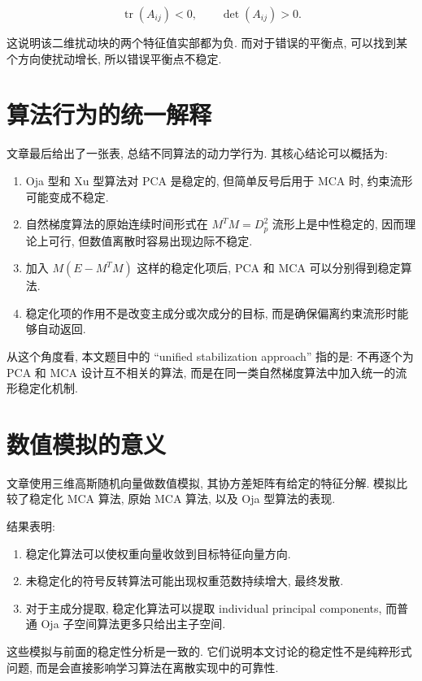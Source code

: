 \documentclass[oneside]{ctexart}
\DeclareMathOperator{\tr}{tr}
\begin{document}
\begin{equation}
    \tr(A_{ij})<0,
    \qquad
    \det(A_{ij})>0.
\end{equation}

这说明该二维扰动块的两个特征值实部都为负. 而对于错误的平衡点, 可以找到某个方向使扰动增长, 所以错误平衡点不稳定.

\section{算法行为的统一解释}

文章最后给出了一张表, 总结不同算法的动力学行为. 其核心结论可以概括为:

\begin{enumerate}[(1)]
    \item Oja 型和 Xu 型算法对 PCA 是稳定的, 但简单反号后用于 MCA 时, 约束流形可能变成不稳定.
    \item 自然梯度算法的原始连续时间形式在 $M^TM=D_p^2$ 流形上是中性稳定的, 因而理论上可行, 但数值离散时容易出现边际不稳定.
    \item 加入 $M(E-M^TM)$ 这样的稳定化项后, PCA 和 MCA 可以分别得到稳定算法.
    \item 稳定化项的作用不是改变主成分或次成分的目标, 而是确保偏离约束流形时能够自动返回.
\end{enumerate}

从这个角度看, 本文题目中的 ``unified stabilization approach'' 指的是: 不再逐个为 PCA 和 MCA 设计互不相关的算法, 而是在同一类自然梯度算法中加入统一的流形稳定化机制.

\section{数值模拟的意义}

文章使用三维高斯随机向量做数值模拟, 其协方差矩阵有给定的特征分解. 模拟比较了稳定化 MCA 算法, 原始 MCA 算法, 以及 Oja 型算法的表现.

结果表明:

\begin{enumerate}[(1)]
    \item 稳定化算法可以使权重向量收敛到目标特征向量方向.
    \item 未稳定化的符号反转算法可能出现权重范数持续增大, 最终发散.
    \item 对于主成分提取, 稳定化算法可以提取 individual principal components, 而普通 Oja 子空间算法更多只给出主子空间.
\end{enumerate}

这些模拟与前面的稳定性分析是一致的. 它们说明本文讨论的稳定性不是纯粹形式问题, 而是会直接影响学习算法在离散实现中的可靠性.
\end{document}
